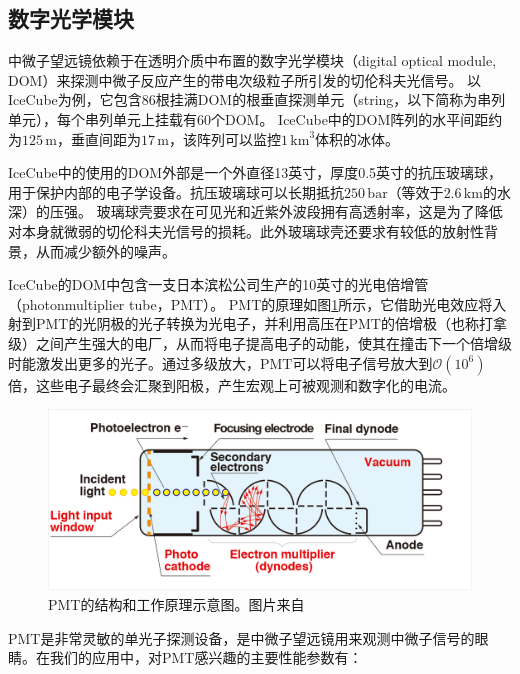 \subsection{数字光学模块}

中微子望远镜依赖于在透明介质中布置的数字光学模块（digital optical module, DOM）来探测中微子反应产生的带电次级粒子所引发的切伦科夫光信号。
以IceCube为例，它包含86根挂满DOM的根垂直探测单元（string，以下简称为串列单元），每个串列单元上挂载有60个DOM\cite{IceCube_detector:2016}。
IceCube中的DOM阵列的水平间距约为$125\,\mathrm{m}$，垂直间距为$17\,\mathrm{m}$，该阵列可以监控$1\,\mathrm{km}^3$体积的冰体。

IceCube中的使用的DOM外部是一个外直径13英寸，厚度0.5英寸的抗压玻璃球，用于保护内部的电子学设备。抗压玻璃球可以长期抵抗$250\,\mathrm{bar}$（等效于$2.6\,\mathrm{km}$的水深）的压强。
玻璃球壳要求在可见光和近紫外波段拥有高透射率，这是为了降低对本身就微弱的切伦科夫光信号的损耗。此外玻璃球壳还要求有较低的放射性背景，从而减少额外的噪声。

IceCube的DOM中包含一支日本滨松公司生产的10英寸的光电倍增管（photonmultiplier tube，PMT）\cite{IceCube_PMT:2010}。
PMT的原理如图\ref{fig:PMT_structure}所示，它借助光电效应将入射到PMT的光阴极的光子转换为光电子，并利用高压在PMT的倍增极（也称打拿级）之间产生强大的电厂，从而将电子提高电子的动能，使其在撞击下一个倍增级时能激发出更多的光子。通过多级放大，PMT可以将电子信号放大到$\mathcal{O}(10^6)$倍，这些电子最终会汇聚到阳极，产生宏观上可被观测和数字化的电流。

\begin{figure}[htb]
    \centering
    \includegraphics[width=0.85\linewidth]{img/PMT_structure.png}
    \caption{PMT的结构和工作原理示意图。图片来自\parencite{PMT_handbook:2016}}
    \label{fig:PMT_structure}
\end{figure}

PMT是非常灵敏的单光子探测设备，是中微子望远镜用来观测中微子信号的眼睛。在我们的应用中，对PMT感兴趣的主要性能参数有：

